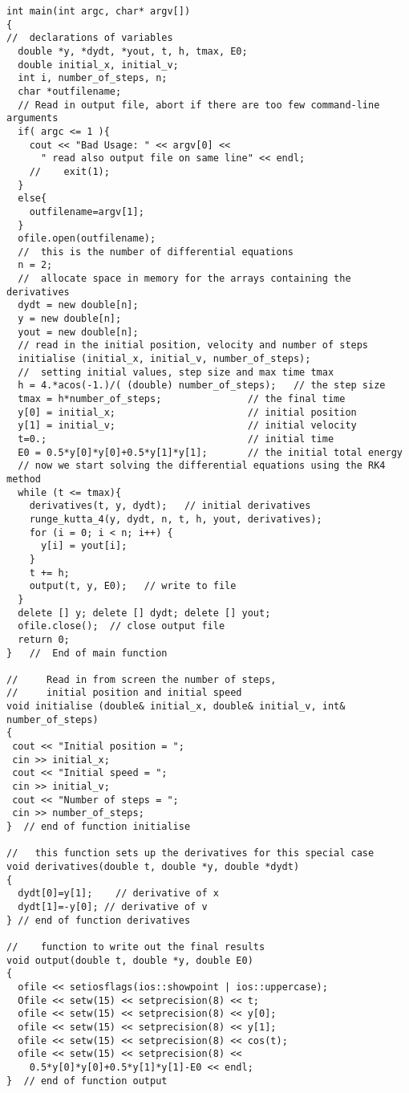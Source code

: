 \documentclass[%
oneside,                 %
final,                   %
10pt]{article}
\begin{document}
\begin{verbatim}
int main(int argc, char* argv[])
{
//  declarations of variables
  double *y, *dydt, *yout, t, h, tmax, E0;
  double initial_x, initial_v;
  int i, number_of_steps, n;
  char *outfilename;
  // Read in output file, abort if there are too few command-line arguments
  if( argc <= 1 ){
    cout << "Bad Usage: " << argv[0] <<
      " read also output file on same line" << endl;
    //    exit(1);
  }
  else{
    outfilename=argv[1];
  }
  ofile.open(outfilename);
  //  this is the number of differential equations  
  n = 2;     
  //  allocate space in memory for the arrays containing the derivatives 
  dydt = new double[n];
  y = new double[n];
  yout = new double[n];
  // read in the initial position, velocity and number of steps 
  initialise (initial_x, initial_v, number_of_steps);
  //  setting initial values, step size and max time tmax  
  h = 4.*acos(-1.)/( (double) number_of_steps);   // the step size     
  tmax = h*number_of_steps;               // the final time    
  y[0] = initial_x;                       // initial position  
  y[1] = initial_v;                       // initial velocity  
  t=0.;                                   // initial time      
  E0 = 0.5*y[0]*y[0]+0.5*y[1]*y[1];       // the initial total energy
  // now we start solving the differential equations using the RK4 method 
  while (t <= tmax){
    derivatives(t, y, dydt);   // initial derivatives              
    runge_kutta_4(y, dydt, n, t, h, yout, derivatives); 
    for (i = 0; i < n; i++) {
      y[i] = yout[i];  
    }
    t += h;
    output(t, y, E0);   // write to file 
  }
  delete [] y; delete [] dydt; delete [] yout;
  ofile.close();  // close output file
  return 0;
}   //  End of main function 

//     Read in from screen the number of steps,
//     initial position and initial speed 
void initialise (double& initial_x, double& initial_v, int& number_of_steps)
{
 cout << "Initial position = ";
 cin >> initial_x;
 cout << "Initial speed = ";
 cin >> initial_v;
 cout << "Number of steps = ";
 cin >> number_of_steps;
}  // end of function initialise  

//   this function sets up the derivatives for this special case  
void derivatives(double t, double *y, double *dydt)
{
  dydt[0]=y[1];    // derivative of x 
  dydt[1]=-y[0]; // derivative of v 
} // end of function derivatives  

//    function to write out the final results
void output(double t, double *y, double E0)
{
  ofile << setiosflags(ios::showpoint | ios::uppercase);
  Ofile << setw(15) << setprecision(8) << t;
  ofile << setw(15) << setprecision(8) << y[0];
  ofile << setw(15) << setprecision(8) << y[1];
  ofile << setw(15) << setprecision(8) << cos(t);
  ofile << setw(15) << setprecision(8) << 
    0.5*y[0]*y[0]+0.5*y[1]*y[1]-E0 << endl;
}  // end of function output


\end{verbatim}
\end{document}
